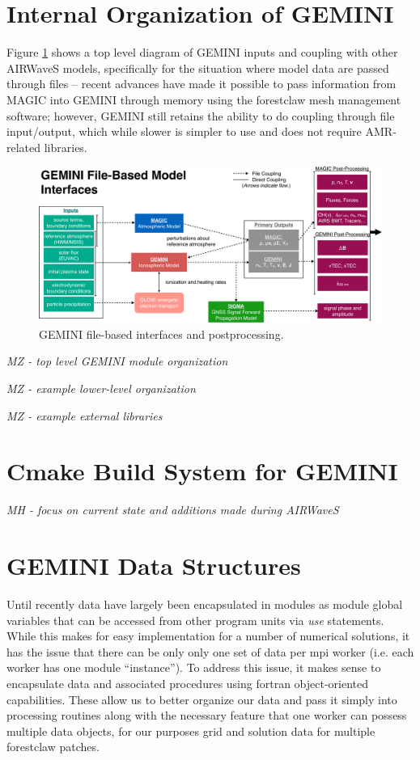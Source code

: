 \documentclass[11pt,letterpaper]{article}
\begin{document}
\section{Internal Organization of GEMINI}

Figure \ref{fig:org} shows a top level diagram of GEMINI inputs and coupling with other AIRWaveS models, specifically for the situation where model data are passed through files -- recent advances have made it possible to pass information from MAGIC into GEMINI through memory using the forestclaw mesh management software; however, GEMINI still retains the ability to do coupling through file input/output, which while slower is simpler to use and does not require AMR-related libraries.  
\begin{figure}
  \centering
  \includegraphics[width=\textwidth]{./figures/GEMINI_org-crop.pdf}
  \caption{GEMINI file-based interfaces and postprocessing.} \label{fig:org}
\end{figure}

\emph{MZ - top level GEMINI module organization}

\emph{MZ - example lower-level organization}

\emph{MZ - example external libraries}


\section{Cmake Build System for GEMINI}

\emph{MH - focus on current state and additions made during AIRWaveS}



\section{GEMINI Data Structures}

Until recently data have largely been encapsulated in modules as module global variables that can be accessed from other program units via \emph{use} statements.  While this makes for easy implementation for a number of numerical solutions, it has the issue that there can be only only one set of data per mpi worker (i.e. each worker has one module ``instance'').  To address this issue, it makes sense to encapsulate data and associated procedures using fortran object-oriented capabilities.  These allow us to better organize our data and pass it simply into processing routines along with the necessary feature that one worker can possess multiple data objects, for our purposes  grid and solution data for multiple forestclaw patches.  
\end{document}
